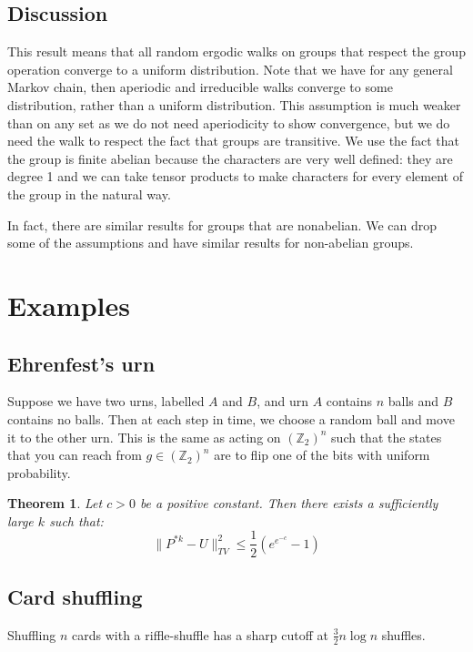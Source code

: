 \documentclass[]{article}
\newtheorem{theorem}{Theorem}
\theoremstyle{definition}
\numberwithin{theorem}{section}
\numberwithin{equation}{section}
\begin{document}
\subsection{Discussion}
This result means that all random ergodic walks on groups that respect the group operation converge to a uniform distribution. Note that we have for any general Markov chain, then aperiodic and irreducible walks converge to some distribution, rather than a uniform distribution. This assumption is much weaker than on any set as we do not need aperiodicity to show convergence, but we do need the walk to respect the fact that groups are transitive. We use the fact that the group is finite abelian because the characters are very well defined: they are degree 1 and we can take tensor products to make characters for every element of the group in the natural way. 

In fact, there are similar results for groups that are nonabelian. We can drop some of the assumptions and have similar results for non-abelian groups.

\section{Examples}
\subsection{Ehrenfest's urn}
Suppose we have two urns, labelled $A$ and $B$, and urn $A$ contains $n$ balls and $B$ contains no balls. Then at each step in time, we choose a random ball and move it to the other urn. This is the same as acting on $(\mathbb{Z}_2)^n$ such that the states that you can reach from $g \in (\mathbb{Z}_2)^n$ are to flip one of the bits with uniform probability. 

\begin{theorem}
	Let $c > 0$ be a positive constant. Then there exists a sufficiently large $k$ such that:
	\begin{equation}
		\|P^{\ast k} - U\|^2_{TV} \leq \frac{1}{2} (e^{e^{-c}} - 1)
	\end{equation}
\end{theorem}

\subsection{Card shuffling}
Shuffling $n$ cards with a riffle-shuffle has a sharp cutoff at $\frac{3}{2} n \log n$ shuffles. 
\end{document}
